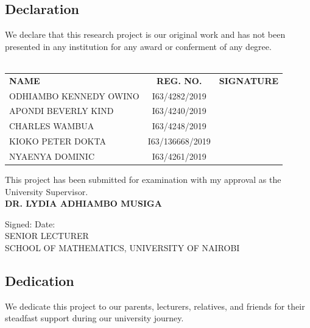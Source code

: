\documentclass{article}
\begin{document}
	\subsection{Declaration}
\noindent We declare that this research project is our original work and has not been presented in any institution for any award or conferment of any degree.\\\\

\begin{tabular}{l c r }
	\vspace{0.5cm}
	\noindent
	\textbf{NAME} & \textbf{REG. NO.} & \textbf{SIGNATURE} \\
	\vspace{0.5cm}
	ODHIAMBO KENNEDY OWINO & I63/4282/2019 & \dotfill \\
	\vspace{0.5cm}
	APONDI BEVERLY KIND & I63/4240/2019 & \dotfill  \\
	\vspace{0.5cm}
	CHARLES WAMBUA & I63/4248/2019 & \dotfill \\
	\vspace{0.5cm}
	KIOKO PETER DOKTA & I63/136668/2019 & \dotfill \\
	\vspace{0.5cm}
	NYAENYA DOMINIC & I63/4261/2019 & \dotfill \\
\end{tabular}

\noindent This project has been submitted for examination with my approval as the University Supervisor.\\

\vspace{0.5cm}
\noindent \textbf{DR. LYDIA ADHIAMBO MUSIGA}\\

\vspace{0.5cm}

\noindent Signed: \dotfill Date: \dotfill \\

\noindent SENIOR LECTURER\\
SCHOOL OF MATHEMATICS, UNIVERSITY OF NAIROBI

\newpage

\subsection{Dedication}

We dedicate this project to our parents, lecturers, relatives, and friends for their steadfast support during our university journey.
\end{document}
